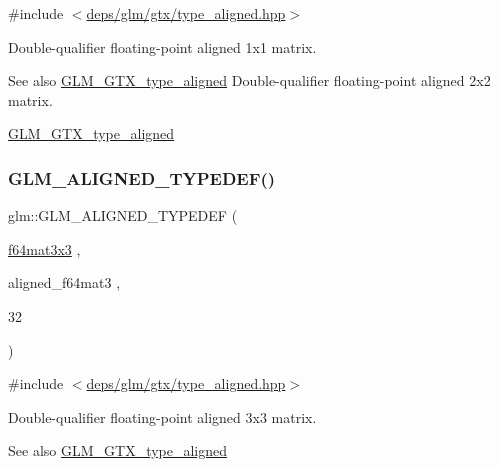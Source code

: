 {\ttfamily \#include $<$\hyperlink{gtx_2type__aligned_8hpp}{deps/glm/gtx/type\+\_\+aligned.\+hpp}$>$}

Double-\/qualifier floating-\/point aligned 1x1 matrix. \begin{DoxySeeAlso}{See also}
\hyperlink{group__gtx__type__aligned}{G\+L\+M\+\_\+\+G\+T\+X\+\_\+type\+\_\+aligned} Double-\/qualifier floating-\/point aligned 2x2 matrix. 

\hyperlink{group__gtx__type__aligned}{G\+L\+M\+\_\+\+G\+T\+X\+\_\+type\+\_\+aligned} 
\end{DoxySeeAlso}
\mbox{\label{group__gtx__type__aligned_gaae8e4639c991e64754145ab8e4c32083}} 
\subsubsection{\texorpdfstring{G\+L\+M\+\_\+\+A\+L\+I\+G\+N\+E\+D\+\_\+\+T\+Y\+P\+E\+D\+E\+F()}{GLM\_ALIGNED\_TYPEDEF()}\hspace{0.1cm}{\footnotesize\ttfamily [194/209]}}
{\footnotesize\ttfamily glm\+::\+G\+L\+M\+\_\+\+A\+L\+I\+G\+N\+E\+D\+\_\+\+T\+Y\+P\+E\+D\+EF (\begin{DoxyParamCaption}\item[{\hyperlink{group__gtc__type__precision_ga3b494201796c4200886e59f9695ecff0}{f64mat3x3}}]{,  }\item[{aligned\+\_\+f64mat3}]{,  }\item[{32}]{ }\end{DoxyParamCaption})}



{\ttfamily \#include $<$\hyperlink{gtx_2type__aligned_8hpp}{deps/glm/gtx/type\+\_\+aligned.\+hpp}$>$}

Double-\/qualifier floating-\/point aligned 3x3 matrix. \begin{DoxySeeAlso}{See also}
\hyperlink{group__gtx__type__aligned}{G\+L\+M\+\_\+\+G\+T\+X\+\_\+type\+\_\+aligned} 
\end{DoxySeeAlso}
\mbox{\label{group__gtx__type__aligned_ga6e9094f3feb3b5b49d0f83683a101fde}} 
